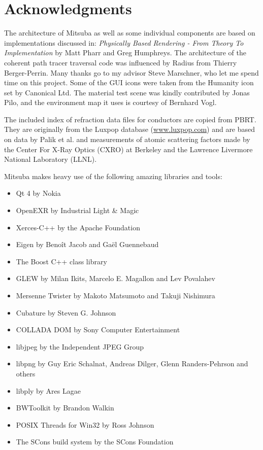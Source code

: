 \section{Acknowledgments}
The architecture of Mitsuba as well as some individual components are based on implementations discussed in: \emph{Physically Based Rendering - From Theory To Implementation} by Matt Pharr and Greg Humphreys.
The architecture of the coherent path tracer traversal code was influenced by Radius from Thierry Berger-Perrin.
Many thanks go to my advisor Steve Marschner, who let me spend time on this project.
Some of the GUI icons were taken from the Humanity icon set by Canonical Ltd.
The material test scene was kindly contributed by Jonas Pilo, and the environment map
it uses is courtesy of Bernhard Vogl.

The included index of refraction data files for conductors are copied from
PBRT. They are originally from the Luxpop database (\url{www.luxpop.com}) 
and are based on data by Palik et al. \cite{Palik1998Handbook}
and measurements of atomic scattering factors made by the Center For
X-Ray Optics (CXRO) at Berkeley and the Lawrence Livermore National 
Laboratory (LLNL).

Mitsuba makes heavy use of the following amazing libraries and tools: 
\begin{itemize}
\item Qt 4 by Nokia
\item OpenEXR by Industrial Light \& Magic
\item Xerces-C+\!+ by the Apache Foundation
\item Eigen by Beno\^it Jacob and Ga\"el Guennebaud
\item The Boost C+\!+ class library
\item GLEW by Milan Ikits, Marcelo E. Magallon and Lev Povalahev
\item Mersenne Twister by Makoto Matsumoto and Takuji Nishimura
\item Cubature by Steven G. Johnson
\item COLLADA DOM by Sony Computer Entertainment
\item libjpeg by the Independent JPEG Group
\item libpng by Guy Eric Schalnat, Andreas Dilger, Glenn Randers-Pehrson and \mbox{others}
\item libply by Ares Lagae
\item BWToolkit by Brandon Walkin
\item POSIX Threads for Win32 by Ross Johnson
\item The SCons build system by the SCons Foundation
\end{itemize}
